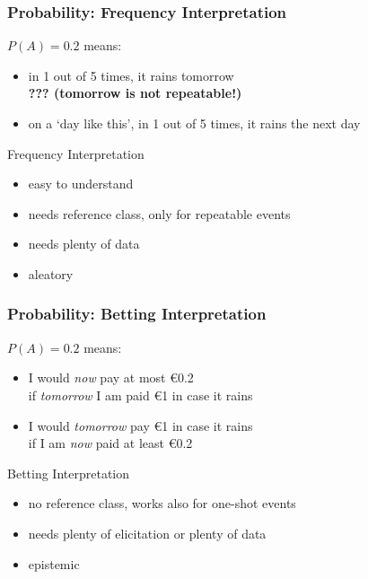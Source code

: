 \documentclass{beamer}
\newcommand{\gplus}{\structure{\textbf{+}}}
\newcommand{\gmins}{\structure{\textbf{--}}}
\newcommand{\gexcl}{\structure{\rule{0.3ex}{0ex}\textbf{!}\rule{0.3ex}{0ex}}}
\begin{document}
\begin{frame}
  \frametitle{Probability: Frequency Interpretation}
  $P(A)=0.2$ means:
  \begin{itemize}
  \item in 1 out of 5 times, it rains tomorrow \\
    \textbf{??? (tomorrow is not repeatable!)}
  \item on a `day like this', in 1 out of 5 times, it rains the next day
  \end{itemize}
  \begin{block}{Frequency Interpretation}
    \begin{itemize}
    \item[\gplus] easy to understand
    \item[\gmins] needs \alert{reference class}, only for \alert{repeatable events}
    \item[\gmins] needs plenty of data
    \item[\gexcl] aleatory
    \end{itemize}
  \end{block}
\end{frame}

\begin{frame}
  \frametitle{Probability: Betting Interpretation}
  $P(A)=0.2$ means:
  \begin{itemize}
  \item I would \textit{now} pay at most \euro 0.2 \\
    if \textit{tomorrow} I am paid \euro 1 in case it rains
  \item I would \textit{tomorrow} pay \euro 1 in case it rains \\
    if I am \textit{now} paid at least \euro 0.2
  \end{itemize}
  \begin{center}
  \end{center}
  \begin{block}{Betting Interpretation}
    \begin{itemize}
    \item[\gplus] no reference class, works also for \alert{one-shot events}
    \item[\gmins] needs plenty of elicitation or plenty of data
    \item[\gexcl] epistemic
    \end{itemize}
  \end{block}
\end{frame}
\end{document}

